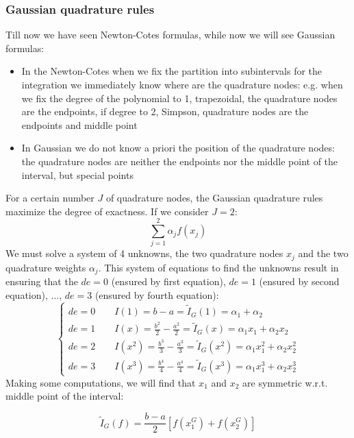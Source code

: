 \subsubsection{Gaussian quadrature rules}
Till now we have seen Newton-Cotes formulas, while now we will see Gaussian formulas:
\begin{itemize}
    \item In the Newton-Cotes when we fix the partition into subintervals for the integration we immediately know where are the quadrature nodes: e.g. when we fix the degree of the polynomial to 1, trapezoidal, the quadrature nodes are the endpoints, if degree to 2, Simpson, quadrature nodes are the endpoints and middle point
    \item In Gaussian we do not know a priori the position of the quadrature nodes: the quadrature nodes are neither the endpoints nor the middle point of the interval, but special points
\end{itemize}
For a certain number $J$ of quadrature nodes, the Gaussian quadrature rules maximize the degree of exactness. If we consider $J=2$:
$$
\sum_{j=1}^2\alpha_jf(x_j)
$$
We must solve a system of 4 unknowns, the two quadrature nodes $x_j$ and the two quadrature weights $\alpha_j$. This system of equations to find the unknowns result in ensuring that the $de=0$ (ensured by first equation), $de=1$ (ensured by second equation), ..., $de=3$ (ensured by fourth equation):
$$
\begin{cases}
    de=0\qquad I(1)=b-a=\tilde{I}_G(1)=\alpha_1+\alpha_2\\
    de=1\qquad I(x)=\frac{b^2}{2}-\frac{a^2}{2}=\tilde{I}_G(x)=\alpha_1x_1+\alpha_2x_2\\
    de=2\qquad I(x^2)=\frac{b^3}{3}-\frac{a^3}{3}=\tilde{I}_G(x^2)=\alpha_1x_1^2+\alpha_2x_2^2\\
    de=3\qquad I(x^3)=\frac{b^4}{4}-\frac{a^4}{4}=\tilde{I}_G(x^3)=\alpha_1x_1^3+\alpha_2x_2^3
\end{cases}
$$
Making some computations, we will find that $x_1$ and $x_2$ are symmetric w.r.t. middle point of the interval:
\begin{LARGE}
    $$
    \tilde{I}_G(f)=\frac{b-a}{2}\left[
        f(x_1^G)+
        f(x_2^G)
    \right]
    $$
\end{LARGE}

